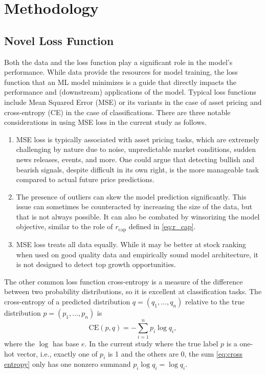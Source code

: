 \documentclass[preprint,12pt,numafflabel,authoryear]{elsarticle}
\begin{document}
\section{Methodology}
\label{sec:Methodology}

\subsection{Novel Loss Function}
\label{sec:Novel Loss Function}

Both the data and the loss function play a significant role in the model's performance. While data provide the resources for model training, the loss function that an ML model minimizes is a guide that directly impacts the performance and (downstream) applications of the model. Typical loss functions include Mean Squared Error (MSE) or its variants in the case of asset pricing and cross-entropy (CE) in the case of classifications. There are three notable considerations in using MSE loss in the current study as follows.
\begin{enumerate}
\item MSE loss is typically associated with asset pricing tasks, which are extremely challenging by nature due to noise, unpredictable market conditions, sudden news releases, events, and more. One could argue that detecting bullish and bearish signals, despite difficult in its own right, is the more manageable task compared to actual future price predictions.
\item The presence of outliers can skew the model prediction significantly. This issue can sometimes be counteracted by increasing the size of the data, but that is not always possible. It can also be combated by winsorizing the model objective, similar to the role of $r_{\text{cap}}$ defined in \eqref{eq:r_cap}.
\item MSE loss treats all data equally. While it may be better at stock ranking when used on good quality data and empirically sound model architecture, it is not designed to detect top growth opportunities.
\end{enumerate}

The other common loss function cross-entropy \citep{shannon1948mathematical} is a measure of the difference between two probability distributions, so it is excellent at classification tasks. The cross-entropy of a predicted distribution $q=(q_1,\dots, q_n)$ relative to the true distribution $p=(p_1,\dots,p_n)$ is
\begin{equation}
\label{eq:cross entropy}
\mathrm{CE}(p, q) = -\sum_{i=1}^n p_i \log q_i,
\end{equation}
where the $\log$ has base $e$. In the current study where the true label $p$ is a one-hot vector, i.e., exactly one of $p_i$ is 1 and the others are 0, the sum \eqref{eq:cross entropy} only has one nonzero summand $p_i\log q_i=\log q_i$.
\end{document}
